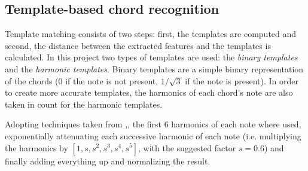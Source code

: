 \subsection{Template-based chord recognition}
\label{subsec:templates}

Template matching consists of two steps: first, the templates are computed and second, the distance between the extracted features and the templates is calculated. In this project two types of templates are used: the \textit{binary templates} and the \textit{harmonic templates}. Binary templates are a simple binary representation of the chords (0 if the note is not present, $1/\sqrt{3}$ if the note is present). In order to create more accurate templates, the harmonics of each chord's note are also taken in count for the harmonic templates.

Adopting techniques taken from \cite{gomez2006tonal},\cite{oudre2009chord}, the first 6 harmonics of each note where used, exponentially attenuating each successive harmonic of each note (i.e. multiplying the harmonics by $[1, s, s^2, s^3, s^4, s^5]$, with the suggested factor $s=0.6$) and finally adding everything up and normalizing the result.